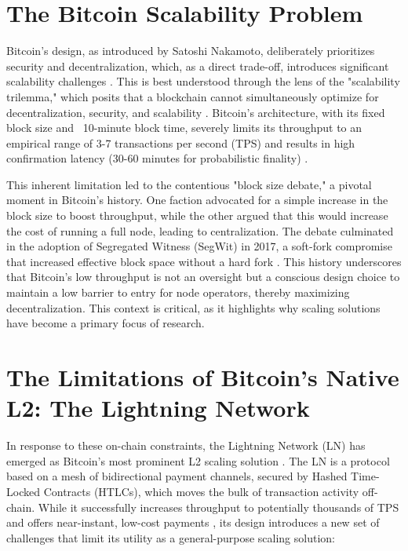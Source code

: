\documentclass{DESSThesis}
\begin{document}
\section{The Bitcoin Scalability Problem}
\label{sec:bitcoin_scalability}

Bitcoin's design, as introduced by Satoshi Nakamoto, deliberately prioritizes security and decentralization, which, as a direct trade-off, introduces significant scalability challenges \cite{nakamoto_bitcoin_nodate}. This is best understood through the lens of the "scalability trilemma," which posits that a blockchain cannot simultaneously optimize for decentralization, security, and scalability \cite{eyal_bitcoin-ng_nodate}. Bitcoin's architecture, with its fixed block size and ~10-minute block time, severely limits its throughput to an empirical range of 3-7 transactions per second (TPS) and results in high confirmation latency (30-60 minutes for probabilistic finality) \cite{croman_scaling_2016, decker_information_2013}.

This inherent limitation led to the contentious "block size debate," a pivotal moment in Bitcoin's history. One faction advocated for a simple increase in the block size to boost throughput, while the other argued that this would increase the cost of running a full node, leading to centralization. The debate culminated in the adoption of Segregated Witness (SegWit) in 2017, a soft-fork compromise that increased effective block space without a hard fork \cite{poon_bitcoin_nodate}. This history underscores that Bitcoin's low throughput is not an oversight but a conscious design choice to maintain a low barrier to entry for node operators, thereby maximizing decentralization. This context is critical, as it highlights why scaling solutions have become a primary focus of research.

\section{The Limitations of Bitcoin's Native L2: The Lightning Network}

In response to these on-chain constraints, the Lightning Network (LN) has emerged as Bitcoin's most prominent L2 scaling solution \cite{poon_bitcoin_nodate}. The LN is a protocol based on a mesh of bidirectional payment channels, secured by Hashed Time-Locked Contracts (HTLCs), which moves the bulk of transaction activity off-chain. While it successfully increases throughput to potentially thousands of TPS and offers near-instant, low-cost payments \cite{gudgeon_sok_2019}, its design introduces a new set of challenges that limit its utility as a general-purpose scaling solution:
\end{document}
